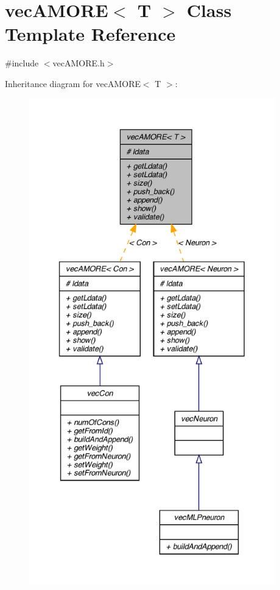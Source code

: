 \hypertarget{classvec_a_m_o_r_e}{
\section{vecAMORE$<$ T $>$ Class Template Reference}
\label{classvec_a_m_o_r_e}
}


{\ttfamily \#include $<$vecAMORE.h$>$}



Inheritance diagram for vecAMORE$<$ T $>$:\nopagebreak
\begin{figure}[H]
\begin{center}
\leavevmode
\includegraphics[height=600pt]{classvec_a_m_o_r_e__inherit__graph}
\end{center}
\end{figure}


